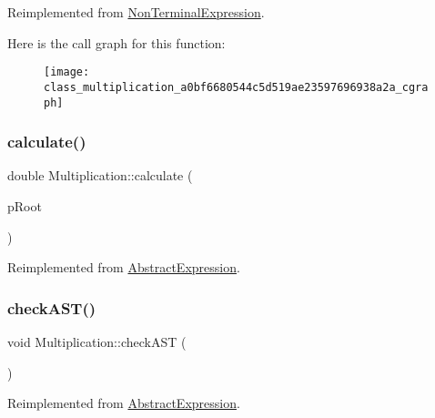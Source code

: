 Reimplemented from \mbox{\hyperlink{class_non_terminal_expression_aa65153b69523e01d86893f6d7b7fc480}{Non\+Terminal\+Expression}}.

Here is the call graph for this function\+:
\nopagebreak
\begin{figure}[H]
\begin{center}
\leavevmode
\texttt{[image: class\_multiplication\_a0bf6680544c5d519ae23597696938a2a\_cgraph]}
\end{center}
\end{figure}
\mbox{\label{class_multiplication_a2d82ad71d5bb01c3fc3bab1240db9031}} 
\subsubsection{\texorpdfstring{calculate()}{calculate()}}
{\footnotesize\ttfamily double Multiplication\+::calculate (\begin{DoxyParamCaption}\item[{std\+::unique\+\_\+ptr$<$ \mbox{\hyperlink{class_abstract_expression}{Abstract\+Expression}} $>$ \&}]{p\+Root }\end{DoxyParamCaption})\hspace{0.3cm}{\ttfamily [virtual]}}



Reimplemented from \mbox{\hyperlink{class_abstract_expression_a1c9871ee669668c2eb9f1f1a7d6f5d32}{Abstract\+Expression}}.

\mbox{\label{class_multiplication_ad6f64d9672c75a25030af352f855309e}} 
\subsubsection{\texorpdfstring{checkAST()}{checkAST()}}
{\footnotesize\ttfamily void Multiplication\+::check\+A\+ST (\begin{DoxyParamCaption}{ }\end{DoxyParamCaption})\hspace{0.3cm}{\ttfamily [virtual]}}



Reimplemented from \mbox{\hyperlink{class_abstract_expression_a703563fdf65d18ce4b7f2817e2ff4581}{Abstract\+Expression}}.

